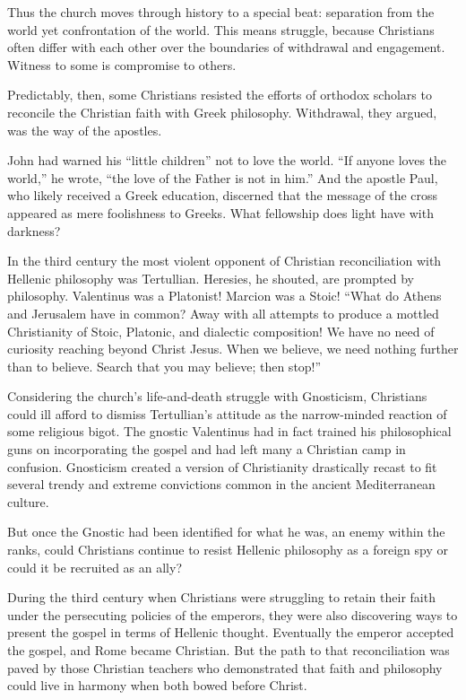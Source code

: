 Thus the church moves through history to a special beat: separation from the world yet confrontation
of the world. This means struggle, because Christians often differ with each other over the
boundaries of withdrawal and engagement. Witness to some is compromise to others.

Predictably, then, some Christians resisted the efforts of orthodox scholars to reconcile the
Christian faith with Greek philosophy. Withdrawal, they argued, was the way of the apostles.

John had warned his “little children” not to love the world. “If anyone loves the world,” he wrote,
“the love of the Father is not in him.” And the apostle Paul, who likely received a Greek education,
discerned that the message of the cross appeared as mere foolishness to Greeks. What fellowship does
light have with darkness?

In the third century the most violent opponent of Christian reconciliation with Hellenic philosophy
was Tertullian. Heresies, he shouted, are prompted by philosophy. Valentinus was a Platonist!
Marcion was a Stoic! “What do Athens and Jerusalem have in common? Away with all attempts to produce
a mottled Christianity of Stoic, Platonic, and dialectic composition! We have no need of curiosity
reaching beyond Christ Jesus. When we believe, we need nothing further than to believe. Search that
you may believe; then stop!”

Considering the church’s life-and-death struggle with Gnosticism, Christians could ill afford to
dismiss Tertullian’s attitude as the narrow-minded reaction of some religious bigot. The gnostic
Valentinus had in fact trained his philosophical guns on incorporating the gospel and had left many
a Christian camp in confusion. Gnosticism created a version of Christianity drastically recast to
fit several trendy and extreme convictions common in the ancient Mediterranean culture.

But once the Gnostic had been identified for what he was, an enemy within the ranks, could
Christians continue to resist Hellenic philosophy as a foreign spy or could it be recruited as an
ally?

During the third century when Christians were struggling to retain their faith under the persecuting
policies of the emperors, they were also discovering ways to present the gospel in terms of Hellenic
thought. Eventually the emperor accepted the gospel, and Rome became Christian. But the path to that
reconciliation was paved by those Christian teachers who demonstrated that faith and philosophy
could live in harmony when both bowed before Christ.

